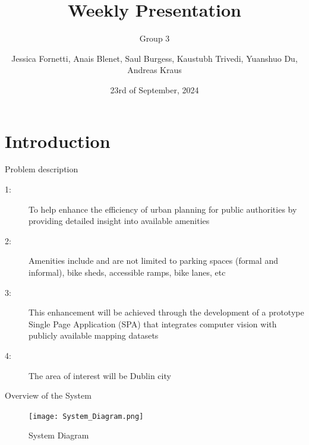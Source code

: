 \documentclass{beamer}
\title[Weekly Presentation]{Weekly Presentation}
\subtitle{Group 3}
\author{Jessica Fornetti, Anais Blenet, Saul Burgess, Kaustubh Trivedi, Yuanshuo Du, Andreas Kraus}
\institute{TU Dublin}
\date{23rd of September, 2024} %
\begin{document}
\begin{frame}
    \titlepage{}
\end{frame}

\section{Introduction}

\begin{frame}{Problem description}  %
    \begin{description}
        \item[1:] To help enhance the efficiency of urban planning for public authorities by providing detailed insight into available amenities
        \item[2:] Amenities include and are not limited to parking spaces (formal and informal), bike sheds, accessible ramps, bike lanes, etc
        \item[3:] This enhancement will be achieved through the development of a prototype Single Page Application (SPA) that integrates computer vision with publicly available mapping datasets 
        \item[4:] The area of interest will be Dublin city 
    \end{description}
\end{frame}

\begin{frame}{Overview of the System}
    \begin{figure}
        \centering
        \texttt{[image: System\_Diagram.png]}
        \caption{System Diagram}
        \label{fig:system_diagram}
    \end{figure}
\end{frame}
\end{document}
